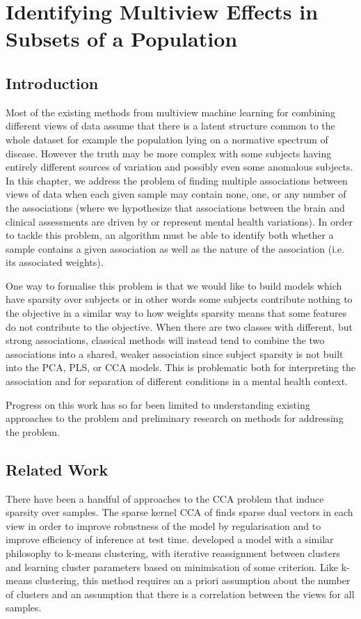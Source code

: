 \chapter{Identifying Multiview Effects in Subsets of a Population}

\section{Introduction}

Most of the existing methods from multiview machine learning for combining different views of data assume that there is a latent structure common to the whole dataset for example the population lying on a normative spectrum of disease. However the truth may be more complex with some subjects having entirely different sources of variation and possibly even some anomalous subjects. In this chapter, we address the problem of finding multiple associations between views of data when each given sample may contain none, one, or any number of the associations (where we hypothesize that associations between the brain and clinical assessments are driven by or represent mental health variations). In order to tackle this problem, an algorithm must be able to identify both whether a sample contains a given association as well as the nature of the association (i.e. its associated weights). 

One way to formalise this problem is that we would like to build models which have sparsity over subjects or in other words some subjects contribute nothing to the objective in a similar way to how weights sparsity means that some features do not contribute to the objective. When there are two classes with different, but strong associations, classical methods will instead tend to combine the two associations into a shared, weaker association since subject sparsity is not built into the PCA, PLS, or CCA models. This is problematic both for interpreting the association and for separation of different conditions in a mental health context.

Progress on this work has so far been limited to understanding existing approaches to the problem and preliminary research on methods for addressing the problem. 

\section{Related Work}
\label{Related Work}

There have been a handful of approaches to the CCA problem that induce sparsity over samples. The sparse kernel CCA of \cite{chu2013sparse} finds sparse dual vectors in each view in order to improve robustness of the model by regularisation and to improve efficiency of inference at test time. \cite{fern2005correlation} developed a model with a similar philosophy to k-means clustering, with iterative reassignment between clusters and learning cluster parameters based on minimisation of some criterion. Like k-means clustering, this method requires an a priori assumption about the number of clusters and an assumption that there is a correlation between the views for all samples. 

